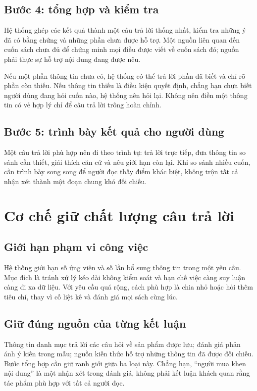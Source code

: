 \subsection{Bước 4: tổng hợp và kiểm tra}
Hệ thống ghép các kết quả thành một câu trả lời thống nhất, kiểm tra những ý đã có bằng chứng và những phần chưa được hỗ trợ. Một nguồn liên quan đến cuốn sách chưa đủ để chứng minh mọi điều được viết về cuốn sách đó; nguồn phải thực sự hỗ trợ nội dung đang được nêu.

Nếu một phần thông tin chưa có, hệ thống có thể trả lời phần đã biết và chỉ rõ phần còn thiếu. Nếu thông tin thiếu là điều kiện quyết định, chẳng hạn chưa biết người dùng đang hỏi cuốn nào, hệ thống nên hỏi lại. Không nên điền một thông tin có vẻ hợp lý chỉ để câu trả lời trông hoàn chỉnh.

\subsection{Bước 5: trình bày kết quả cho người dùng}
Một câu trả lời phù hợp nên đi theo trình tự: trả lời trực tiếp, đưa thông tin so sánh cần thiết, giải thích căn cứ và nêu giới hạn còn lại. Khi so sánh nhiều cuốn, cần trình bày song song để người đọc thấy điểm khác biệt, không trộn tất cả nhận xét thành một đoạn chung khó đối chiếu.

\section{Cơ chế giữ chất lượng câu trả lời}

\subsection{Giới hạn phạm vi công việc}
Hệ thống giới hạn số ứng viên và số lần bổ sung thông tin trong một yêu cầu. Mục đích là tránh xử lý kéo dài không kiểm soát và hạn chế việc càng suy luận càng đi xa dữ liệu. Với yêu cầu quá rộng, cách phù hợp là chia nhỏ hoặc hỏi thêm tiêu chí, thay vì cố liệt kê và đánh giá mọi sách cùng lúc.

\subsection{Giữ đúng nguồn của từng kết luận}
Thông tin danh mục trả lời các câu hỏi về sản phẩm được lưu; đánh giá phản ánh ý kiến trong mẫu; nguồn kiến thức hỗ trợ những thông tin đã được đối chiếu. Bước tổng hợp cần giữ ranh giới giữa ba loại này. Chẳng hạn, ``người mua khen nội dung'' là một nhận xét trong đánh giá, không phải kết luận khách quan rằng tác phẩm phù hợp với tất cả người đọc.

